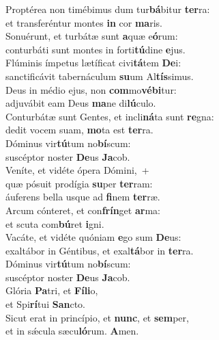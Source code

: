 \evenverse Proptérea non timébimus dum tur\textbf{bá}bitur \textbf{ter}ra:~\*\\
\evenverse et transferéntur montes \textbf{in} cor \textbf{ma}ris.\\
\oddverse Sonuérunt, et turbátæ sunt \textbf{a}quæ e\textbf{ó}rum:~\*\\
\oddverse conturbáti sunt montes in forti\textbf{tú}dine \textbf{e}jus.\\
\evenverse Flúminis ímpetus lætíficat civi\textbf{tá}tem \textbf{De}i:~\*\\
\evenverse sanctificávit tabernáculum \textbf{su}um Al\textbf{tís}simus.\\
\oddverse Deus in médio ejus, non \textbf{com}mo\textbf{vé}\textbf{bi}tur:~\*\\
\oddverse adjuvábit eam Deus \textbf{ma}ne di\textbf{lú}culo.\\
\evenverse Conturbátæ sunt Gentes, et incli\textbf{ná}ta sunt \textbf{re}gna:~\*\\
\evenverse dedit vocem suam, \textbf{mo}ta est \textbf{ter}ra.\\
\oddverse Dóminus vir\textbf{tú}tum no\textbf{bí}scum:~\*\\
\oddverse suscéptor noster \textbf{De}us \textbf{Ja}cob.\\
\evenverse Veníte, et vidéte ópera Dómini,~+\\
\evenverse  quæ pósuit prodígia \textbf{su}per \textbf{ter}ram:~\*\\
\evenverse áuferens bella usque ad \textbf{fi}nem \textbf{ter}ræ.\\
\oddverse Arcum cónteret, et con\textbf{frín}get \textbf{ar}ma:~\*\\
\oddverse et scuta com\textbf{bú}ret \textbf{i}gni.\\
\evenverse Vacáte, et vidéte quóniam \textbf{e}go sum \textbf{De}us:~\*\\
\evenverse exaltábor in Géntibus, et exal\textbf{tá}bor in \textbf{ter}ra.\\
\oddverse Dóminus vir\textbf{tú}tum no\textbf{bí}scum:~\*\\
\oddverse suscéptor noster \textbf{De}us \textbf{Ja}cob.\\
\evenverse Glória \textbf{Pa}tri, et \textbf{Fí}\textbf{li}o,~\*\\
\evenverse et Spi\textbf{rí}tui \textbf{San}cto.\\
\oddverse Sicut erat in princípio, et \textbf{nunc}, et \textbf{sem}per,~\*\\
\oddverse et in sǽcula sæcu\textbf{ló}rum. \textbf{A}men.\\
